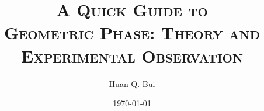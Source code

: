 \documentclass{article}
\theoremstyle{definition}
\begin{document}
	\begin{titlepage}\centering
		\clearpage
		\title{\textsc{$\,$\\$\,$\\$\,$\\$\,$\\$\,$\\ \bf{A Quick Guide to \\ Geometric Phase: Theory and Experimental Observation}}}
		\author{\bigskip Huan Q. Bui}
		\date{\today}
		\maketitle
		\thispagestyle{empty}
	\end{titlepage}




\newpage
\tableofcontents
\newpage
\end{document}
